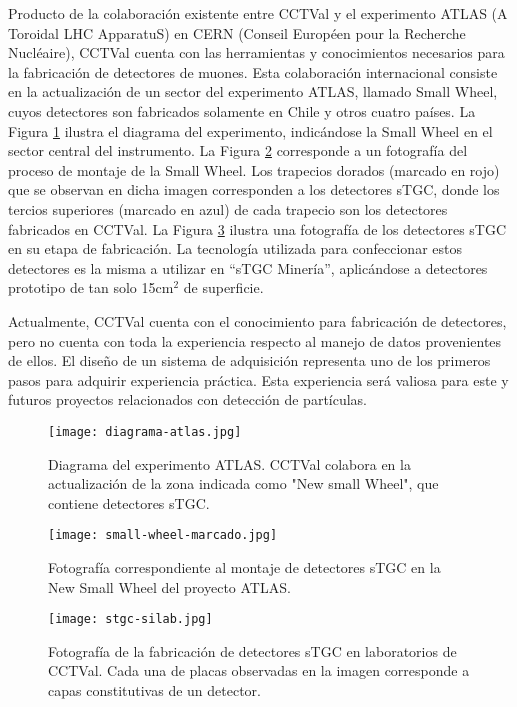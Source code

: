 	Producto de la colaboración existente entre CCTVal y el experimento ATLAS (A Toroidal LHC ApparatuS) en CERN (Conseil Européen pour la Recherche Nucléaire), CCTVal cuenta con las herramientas y conocimientos necesarios para la fabricación de detectores de muones. Esta colaboración internacional consiste en la actualización de un sector del experimento ATLAS, llamado Small Wheel, cuyos detectores son fabricados solamente en Chile y otros cuatro países. La Figura \ref{img:diagrama-atlas} ilustra el diagrama del experimento, indicándose la Small Wheel en el sector central del instrumento. La Figura \ref{img:small-wheel} corresponde a un fotografía  del proceso de montaje de la Small Wheel. Los trapecios dorados (marcado en rojo) que se observan en dicha imagen corresponden a los detectores sTGC, donde los tercios superiores (marcado en azul) de cada trapecio son los detectores fabricados en CCTVal. La Figura \ref{img:stgc-silab} ilustra una fotografía de los detectores sTGC en su etapa de fabricación. La tecnología utilizada para confeccionar estos detectores es la misma a utilizar en ``sTGC Minería'', aplicándose a detectores prototipo de tan solo 15cm$^2$ de superficie.
	
	Actualmente, CCTVal cuenta con el conocimiento para fabricación de detectores, pero no cuenta con toda la experiencia respecto al manejo de datos provenientes de ellos. El diseño de un sistema de adquisición representa uno de los primeros pasos para adquirir experiencia práctica. Esta experiencia será valiosa para este y futuros proyectos relacionados con detección de partículas.
	
	
	\begin{figure}[h]
		\centering
		\texttt{[image: diagrama-atlas.jpg]}
		\caption{Diagrama del experimento ATLAS. CCTVal colabora en la actualización de la zona indicada como "New small Wheel", que contiene detectores sTGC.}
		\label{img:diagrama-atlas}
	\end{figure}

	\begin{figure}[h]
		\centering
		\texttt{[image: small-wheel-marcado.jpg]}
		\caption{Fotografía correspondiente al montaje de detectores sTGC en la New Small Wheel del proyecto ATLAS.}
		\label{img:small-wheel}
	\end{figure}
	
	\begin{figure}[h]
		\centering
		\texttt{[image: stgc-silab.jpg]}
		\caption{Fotografía de la fabricación de detectores sTGC en laboratorios de CCTVal. Cada una de placas observadas en la imagen corresponde a capas constitutivas de un detector.}
		\label{img:stgc-silab}
	\end{figure}

